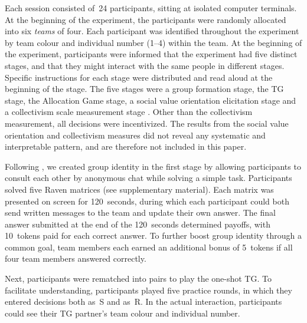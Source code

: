 \documentclass[12pt,a4paper]{article}\usepackage[]{graphicx}\usepackage[]{color}
\begin{document}
Each session consisted of~24 participants, sitting at isolated computer terminals. 
At the beginning of the experiment, the participants were randomly allocated into six
\emph{teams} of four. Each participant was identified throughout the experiment
by team colour and individual number (1--4) within the team. At the beginning of
the experiment, participants were informed that the experiment had five distinct
stages, and that they might interact with the same people in different stages.
Specific instructions for each stage were distributed and read aloud at the
beginning of the stage. The five stages were a group formation stage, the TG
stage, the Allocation Game stage, a social value orientation elicitation stage
\citep*{murphy2011measuring} and a collectivism scale measurement stage
\citep*[adapted from the horizontal collectivism scale
in][]{Singelis1995horizontal}. 
Other than the collectivism measurement, all decisions were incentivized.
The results from the social value orientation and collectivism measures did not reveal any systematic and interpretable pattern, and are therefore not included in this paper. 

Following \citep{chen2009group}, we created group identity in the
first stage by allowing participants to consult each other by anonymous
chat while solving a simple task. Participants solved five Raven matrices
(see supplementary material). Each matrix was presented on screen
for 120~seconds, during which each participant could both send written
messages to the team and update their own answer. The final answer submitted
at the end of the 120~seconds determined payoffs, with 10~tokens
paid for each correct answer. To further boost group identity through
a common goal, team members each earned an additional bonus of 5~tokens
if all four team members answered correctly.

Next, participants were rematched into pairs to play the one-shot
TG. To facilitate understanding, participants played five practice
rounds, in which they entered decisions both as~S and as~R. In the
actual interaction, participants could see their TG partner's team
colour and individual number. 
\end{document}

